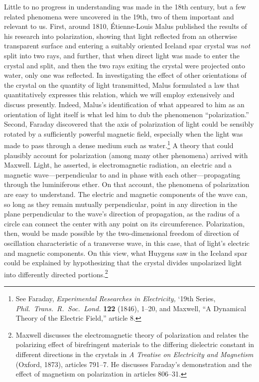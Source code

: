 Little to no progress in understanding was made in the 18th century, but a few related phenomena were uncovered in the 19th, two of them important and relevant to us. First, around 1810, \'Etienne-Louis Malus published the results of his research into polarization, showing that light reflected from an otherwise transparent surface and entering a suitably oriented Iceland spar crystal was \emph{not} split into two rays, and further, that when direct light was made to enter the crystal and split, and then the two rays exiting the crystal were projected onto water, only one was reflected. In investigating the effect of other orientations of the crystal on the quantity of light transmitted, Malus formulated a law that quantitatively expresses this relation, which we will employ extensively and discuss presently. Indeed, Malus's identification of what appeared to him as an orientation of light itself is what led him to dub the phenomenon ``polarization.'' Second, Faraday dis\-co\-ve\-red that the axis of polarization of light could be sensibly rotated by a sufficiently pow\-er\-ful mag\-net\-ic field, especially when the light was made to pass through a dense medium such as water.\footnote{See Faraday, \emph{Experimental Researches in Electricity,} `19th Series, \emph{Phil.\ Trans.\ R.\ Soc.\ Lond.} \textbf{122} (1846), 1--20, and Maxwell, ``A Dynamical Theory of the Electric Field,'' article 8.} A theory that could plausibly account for polarization (among many other phe\-nom\-e\-na) arrived with Maxwell. Light, he asserted, is electromagnetic radiation, an electric and a magnetic wave---perpendicular to and in phase with each other---propagating through the luminiferous ether. On that account, the phenomena of polarization are easy to understand. The electric and magnetic components of the wave can, so long as they remain mutually perpendicular, point in any direction in the plane perpendicular to the wave’s direction of propagation, as the radius of a circle can connect the center with any point on its circumference. Polarization, then, would be made possible by the two-dimensional freedom of direction of oscillation characteristic of a transverse wave, in this case, that of light's electric and magnetic components. On this view, what Huygens saw in the Iceland spar could be explained by hypothesizing that the crystal divides unpolarized light into differently directed portions.\footnote{Maxwell discusses the electromagnetic theory of polarization and relates the polarizing effect of birefringent materials to the differing dielectric constant in different directions in the crystals in \emph{A Treatise on Electricity and Magnetism} (Oxford, 1873), articles 791--7. He discusses Faraday's demonstration and the effect of magnetism on polarization in articles 806--31.}

